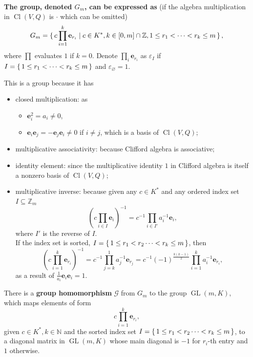 \documentclass[12pt, letterpaper]{article}
\newcommand{\nat}{\mathbb{N}}
\newcommand{\inte}{\mathbb{Z}}
\newcommand{\GL}{\operatorname{GL}}
\newcommand{\Cl}{\operatorname{Cl}}
\newcommand{\bfe}{\mathbf{e}}
\newcommand{\card}[1]{\left\lvert #1 \right\rvert}
\renewcommand{\emptyset}{\varnothing}
\theoremstyle{definition}
\theoremstyle{remark}
\theoremstyle{definition}
\theoremstyle{plain}
\numberwithin{equation}{section}
\begin{document}
	\textbf{The group, denoted $G_m$, can be expressed as} (if the algebra multiplication in $\Cl(V,Q)$ is $\cdot$ which can be omitted)
	\[
	G_m = \set{c\prod_{i=1}^k \mathbf{e}_{r_i}|c\in K^*, k\in[0,m]\cap\inte,  1\le r_1<\dots<r_k\le m },
	\]
	where $\prod$ evaluates $1$ if $k=0$.
	Denote $\prod_i\mathbf{e}_{r_i}$ as $\varepsilon_I$ if $I=\set{1\le r_1<\dots<r_k\le m}$
	and $\varepsilon_\emptyset=1$.
	
	This is a group because it has
	\begin{itemize}
		\item closed multiplication: as
			\begin{itemize}
				\item $\mathbf{e}_i^2=a_i\ne0$,
				\item $\mathbf{e}_i\mathbf{e}_j=-\mathbf{e}_j\mathbf{e}_i\ne0$ if $i\ne j$, which is a basis of $\Cl(V,Q)$;
			\end{itemize}
		\item multiplicative associativity: because Clifford algebra is associative;
		\item identity element: since the multiplicative identity $1$ in Clifford algebra is itself a nonzero basis of $\Cl(V,Q)$;%
		\item multiplicative inverse: because given any $c\in K^*$ and any ordered index set $I\subseteq \inte_m$
		\[ \left(c\prod_{i\in I}\bfe_i \right)^{-1}=c^{-1}\prod_{i\in I'}a_i^{-1}\bfe_i, \]
		where $I'$ is the reverse of $I$. \\%
		If the index set is sorted,
		$I=\set{1\le r_1 < r_2 \dots < r_k \le m }$,
		then
		\[\left(c\prod_{i=1}^{k}\bfe_{r_i} \right)^{-1}=c^{-1}\prod_{j=k}^1a_j^{-1}\bfe_{r_{j}}=c^{-1}(-1)^{\frac{k(k-1)}{2}}\prod_{i=1}^ka_i^{-1}\bfe_{r_{i}}, \]
		as a result of $\frac{1}{a_i}\bfe_i\bfe_i=1$.%
	\end{itemize}
	
	There is a \textbf{group homomorphism} $\mathcal{G}$ from $G_m$ to the group $\GL(m, K)$, which maps
	elements of form 
	\[c\prod_{i=1}^{k}\bfe_{r_i}, \]
	given $c\in K^*,k\in \nat$ and the sorted index set $I=\set{1\le r_1 < r_2 \dots < r_k \le m }$,
	to a diagonal matrix in $\GL(m,K)$ whose main diagonal is $-1$ for $r_i$-th entry and $1$ otherwise.
	
\end{document}
